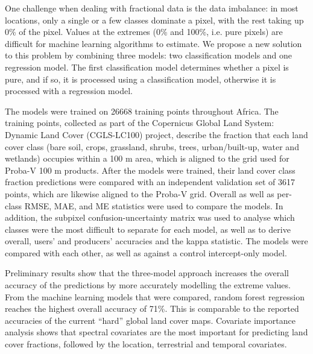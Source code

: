 \documentclass[a4paper,10pt]{article}
\begin{document}
{One challenge when dealing with fractional data is the data imbalance: in most locations, only a single or a few classes dominate a pixel, with the rest taking up 0\% of the pixel. Values at the extremes (0\% and 100\%, i.e. pure pixels) are difficult for machine learning algorithms to estimate. We propose a new solution to this problem by combining three models: two classification models and one regression model. The first classification model determines whether a pixel is pure, and if so, it is processed using a classification model, otherwise it is processed with a regression model.


The models were trained on 26668 training points throughout Africa. The training points, collected as part of the Copernicus Global Land System: Dynamic Land Cover (CGLS-LC100) project, describe the fraction that each land cover class (bare soil, crops, grassland, shrubs, trees, urban/built-up, water and wetlands) occupies within a 100 m area, which is aligned to the grid used for Proba-V 100 m products. After the models were trained, their land cover class fraction predictions were compared with an independent validation set of 3617 points, which are likewise aligned to the Proba-V grid. Overall as well as per-class RMSE, MAE, and ME statistics were used to compare the models. In addition, the subpixel confusion-uncertainty matrix was used to analyse which classes were the most difficult to separate for each model, as well as to derive overall, users' and producers' accuracies and the kappa statistic. The models were compared with each other, as well as against a control intercept-only model.

Preliminary results show that the three-model approach increases the overall accuracy of the predictions by more accurately modelling the extreme values. From the machine learning models that were compared, random forest regression reaches the highest overall accuracy of 71\%. This is comparable to the reported accuracies of the current ``hard'' global land cover maps. Covariate importance analysis shows that spectral covariates are the most important for predicting land cover fractions, followed by the location, terrestrial and temporal covariates.

}
\end{document}
